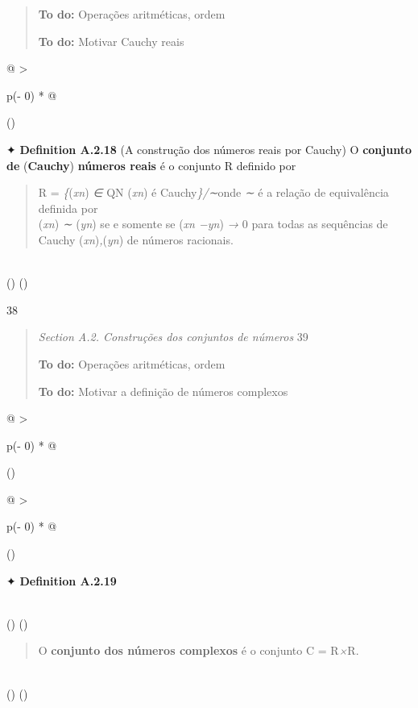 \documentclass[
]{article}
\begin{document}
\begin{quote}
\textbf{To do:} Operações aritméticas, ordem

\textbf{To do:} Motivar Cauchy reais
\end{quote}

\begin{longtable}[]{@{}
  >{\raggedright\arraybackslash}p{(\columnwidth - 0\tabcolsep) * }@{}}
\toprule()
\begin{minipage}[b]{\linewidth}\raggedright
✦ \textbf{Definition A.2.18} (A construção dos números reais por Cauchy)
O \textbf{conjunto de} (\textbf{Cauchy}) \textbf{números reais} é o
conjunto R definido por

\begin{quote}
R = \emph{\{}(\emph{xn}) \emph{∈} QN\emph{\textbar{}} (\emph{xn}) é
Cauchy\emph{\}/∼}onde \emph{∼} é a relação de equivalência definida
por\\
(\emph{xn}) \emph{∼} (\emph{yn}) se e somente se (\emph{xn −yn})
\emph{→} 0 para todas as sequências de Cauchy
(\emph{xn})\emph{,}(\emph{yn}) de números racionais.
\end{quote}\strut
\end{minipage} \\
\midrule()
\endhead
\bottomrule()
\end{longtable}

38

\begin{quote}
\emph{Section A.2. Construções dos conjuntos de números} 39

\textbf{To do:} Operações aritméticas, ordem

\textbf{To do:} Motivar a definição de números complexos
\end{quote}

\begin{longtable}[]{@{}
  >{\raggedright\arraybackslash}p{(\columnwidth - 0\tabcolsep) * }@{}}
\toprule()
\begin{minipage}[b]{\linewidth}\raggedright
\begin{longtable}[]{@{}
  >{\raggedright\arraybackslash}p{(\columnwidth - 0\tabcolsep) * }@{}}
\toprule()
\begin{minipage}[b]{\linewidth}\raggedright
✦ \textbf{Definition A.2.19}
\end{minipage} \\
\midrule()
\endhead
\bottomrule()
\end{longtable}

\begin{quote}
O \textbf{conjunto dos números complexos} é o conjunto C = R\emph{×}R.
\end{quote}
\end{minipage} \\
\midrule()
\endhead
\bottomrule()
\end{longtable}
\end{document}
